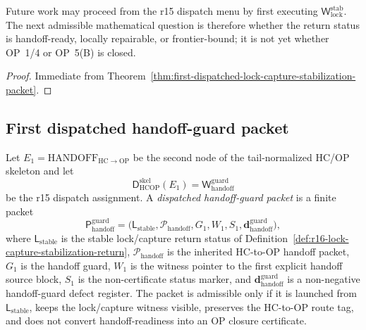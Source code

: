 \begin{corollary}
\label{cor:v3340-r16-working-rule}
Future work may proceed from the r15 dispatch menu by first executing \(\mathsf W_{\mathrm{lock}}^{\mathrm{stab}}\).  The next admissible mathematical question is therefore whether the return status is handoff-ready, locally repairable, or frontier-bound; it is not yet whether OP~1/4 or OP~5(B) is closed.
\end{corollary}

\begin{proof}
Immediate from Theorem~\ref{thm:first-dispatched-lock-capture-stabilization-packet}.
\end{proof}


\subsection{First dispatched handoff-guard packet}
\label{subsec:first-dispatched-handoff-guard-packet}

\begin{definition}
\label{def:dispatched-handoff-guard-packet}
Let \(E_1=\mathrm{HANDOFF}_{\mathrm{HC}\to\mathrm{OP}}\) be the second node of the tail-normalized HC/OP skeleton and let
\[
  \mathsf D_{\mathrm{HCOP}}^{\mathrm{skel}}(E_1)
  =
  \mathsf W_{\mathrm{handoff}}^{\mathrm{guard}}
\]
be the r15 dispatch assignment.  A \emph{dispatched handoff-guard packet} is a finite packet
\[
  \mathsf P_{\mathrm{handoff}}^{\mathrm{guard}}
  =
  \bigl(\mathsf L_{\mathrm{stable}},\mathcal P_{\mathrm{handoff}},G_1,W_1,S_1,
        \mathbf d_{\mathrm{handoff}}^{\mathrm{guard}}\bigr),
\]
where \(\mathsf L_{\mathrm{stable}}\) is the stable lock/capture return status of Definition~\ref{def:r16-lock-capture-stabilization-return}, \(\mathcal P_{\mathrm{handoff}}\) is the inherited HC-to-OP handoff packet, \(G_1\) is the handoff guard, \(W_1\) is the witness pointer to the first explicit handoff source block, \(S_1\) is the non-certificate status marker, and \(\mathbf d_{\mathrm{handoff}}^{\mathrm{guard}}\) is a non-negative handoff-guard defect register.  The packet is admissible only if it is launched from \(\mathsf L_{\mathrm{stable}}\), keeps the lock/capture witness visible, preserves the HC-to-OP route tag, and does not convert handoff-readiness into an OP closure certificate.
\end{definition}


